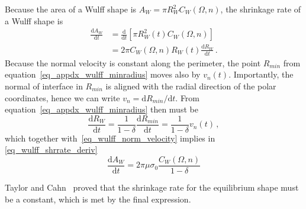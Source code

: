 	Because the area of a Wulff shape is $A_W=\pi R_W^2C_W(\Omega,n)$, the shrinkage rate of a Wulff shape is
	\begin{equation}\label{eq_wulff_shrrate_deriv}
		\begin{split}
			\frac{\mathrm{d}A_W}{\mathrm{d}t} &= \frac{\mathrm{d}}{\mathrm{d}t}[\pi R_W^2(t)C_W(\Omega,n)]    \\
			&= 2\pi C_W(\Omega,n) R_W(t) \frac{\mathrm{d}R_W}{\mathrm{d}t} \,.
		\end{split}
	\end{equation}
	Because  the normal velocity is constant along the perimeter, the point $R_{min}$ from equation~\eqref{eq_appdx_wulff_minradius} moves also by $v_n(t)$. Importantly, the normal of interface in $R_{min}$ is aligned with the radial direction of the polar coordinates, hence we can write $v_n=\mathrm{d}R_{min}/\mathrm{d}t$. From equation~\eqref{eq_appdx_wulff_minradius} then must be
	\begin{equation}
		\frac{\mathrm{d}R_{W}}{\mathrm{d}t}=\frac{1}{1-\delta}\frac{\mathrm{d}R_{min}}{\mathrm{d}t}=\frac{1}{1-\delta}v_n(t) \,,
	\end{equation}
	which together with~\ref{eq_wulff_norm_velocity} implies in \ref{eq_wulff_shrrate_deriv}
	\begin{equation}
		\frac{\mathrm{d}A_W}{\mathrm{d}t} = 2\pi\mu\sigma_0  \frac{C_W(\Omega,n)}{1-\delta} 
	\end{equation}
	
	Taylor and Cahn~\cite{Taylor1998} proved that the shrinkage rate for the equilibrium shape must be a constant, which is met by the final expression.
	
	
